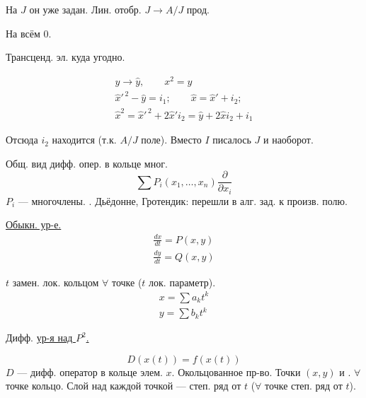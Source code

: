На $J$ он уже задан.
Лин. отобр. $J\to A/J$ прод.
\par
На всём $0$.
\par
Трансценд. эл. куда угодно.
\par\noindent\begin{minipage}{\linewidth}
\begin{gather*}
y\to\hat y,\qquad x^2=y\\
\hat x'^{\,2}-\hat y=i_1;\qquad
\hat x=\hat x'+i_2;\\
\hat x^2=\hat x'^{\,2}+2\hat x'i_2
=\hat y+2\hat xi_2+i_1
\end{gather*}
\end{minipage}\par
Отсюда $i_2$ находится (т.к. $A/J$ поле).
Вместо $I$ писалось $J$ и наоборот.
\par\medskip{\centering\rule{12mm}{.45pt}\enspace$\cdot$\enspace\rule{15mm}{.45pt}\par}\medskip
Общ. вид дифф. опер. в кольце мног.
\begin{equation*}
\sum P_i(x_1,\ldots,x_n)\frac{\partial}{\partial x_i}
\end{equation*}
$P_i$ — многочлены.
 .
Дьёдонне, Гротендик: перешли в алг. зад. к произв. полю.
\par\noindent\begin{minipage}{\linewidth}
\underline{Обыкн. ур-е.}
\begin{gather*}
\frac{dx}{dt}=P(x,y)\\
\frac{dy}{dt}=Q(x,y)
\end{gather*}
\end{minipage}\par
$t$ замен. лок. кольцом $\forall$ точке ($t$ лок. параметр).
\begin{gather*}
x=\sum a_k t^k\\
y=\sum b_k t^k
\end{gather*}
\par\noindent\begin{minipage}{\linewidth}
Дифф. \underline{ур-я над $P^2$.}
\end{minipage}\par
\begin{equation*}
D(x(t))=f(x(t))
\end{equation*}
$D$ — дифф. оператор в кольце элем. $x$.
Окольцованное пр-во. Точки $(x,y)$ и .
$\forall$ точке кольцо.
Слой над каждой точкой — степ. ряд от $t$
($\forall$ точке степ. ряд от $t$).

